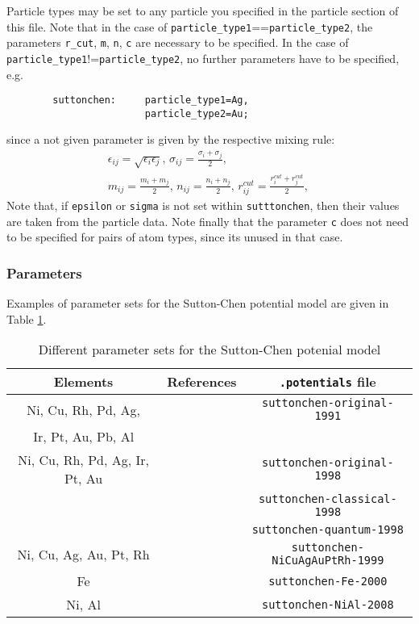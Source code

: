 Particle types may be set to any particle you specified in the
particle section of this file.  Note that in the case of
\verb+particle_type1+==\verb+particle_type2+, the parameters
\verb+r_cut+, \verb+m+, \verb+n+, \verb+c+ are necessary to be
specified.  In the case of
\verb+particle_type1+!=\verb+particle_type2+, no further parameters
have to be specified, e.g.\
\begin{lstlisting}
        suttonchen:     particle_type1=Ag,
                        particle_type2=Au;
\end{lstlisting}
since a not given parameter is given by the
respective mixing rule:
\begin{align*} %
  \epsilon_{ij} = \sqrt{\epsilon_i\epsilon_j} , \,
  \sigma_{ij}  = \frac{\sigma_i+\sigma_j}{2} , \,\\
  m_{ij} = \frac{m_i+m_j}{2} , \,
  n_{ij} = \frac{n_i+n_j}{2} , \,
  r^{cut}_{ij} = \frac{r^{cut}_{i}+r^{cut}_{j}}{2} , \,
\end{align*}
Note that, if \verb+epsilon+ or \verb+sigma+ is not set within
\verb+sutttonchen+, then their values are taken from the particle
data. Note finally that the parameter \verb+c+ does not need to be
specified for pairs of atom types, since its unused in that case.

\subsubsection{Parameters}
Examples of parameter sets for the Sutton-Chen potential model are given in Table \ref{tab:SuttonChen}.

\begin{table}
  \caption{Different parameter sets for the Sutton-Chen potenial model}
  \label{tab:SuttonChen}
  {\small
    \begin{center}
      \begin{tabular}{ccc}
        Elements & References & \texttt{.potentials} file \\\hline
        Ni, Cu, Rh, Pd, Ag,  & \cite{rafii1991long} & \verb+suttonchen-original-1991+\\
         Ir, Pt, Au, Pb, Al &  & \\\hline
        Ni, Cu, Rh, Pd, Ag, Ir, Pt, Au & \cite{kimura1998quantum} & \verb+suttonchen-original-1998+\\
         &  & \verb+suttonchen-classical-1998+\\
         &  & \verb+suttonchen-quantum-1998+\\\hline
         Ni, Cu, Ag, Au, Pt, Rh & \cite{ccaugin1999thermal} & \verb+suttonchen-NiCuAgAuPtRh-1999+\\\hline
         Fe & \cite{belonoshko2000quasi} & \verb+suttonchen-Fe-2000+\\\hline
         Ni, Al & \cite{kazanc2008investigation} & \verb+suttonchen-NiAl-2008+\\\hline
      \end{tabular}
    \end{center}
  }
\end{table}


